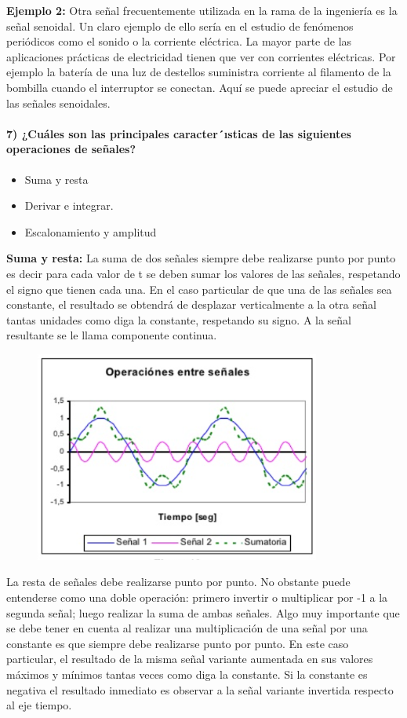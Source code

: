 \documentclass[10pt]{article}
\begin{document}
\textbf{Ejemplo 2:}
Otra señal frecuentemente utilizada en la rama de la ingeniería es la señal senoidal.  Un claro ejemplo de ello sería en el estudio de fenómenos periódicos como el sonido o la corriente eléctrica. La mayor parte de las aplicaciones prácticas de electricidad tienen que ver con corrientes eléctricas. Por ejemplo la batería de una luz de destellos suministra corriente al filamento de la bombilla cuando el interruptor se conectan. Aquí se puede apreciar el estudio de las señales senoidales.\\

\paragraph{7) ¿Cuáles son las principales caracter´ısticas de las siguientes operaciones de señales? }

\begin{itemize}
	\item Suma y resta
	\item Derivar e integrar.
	\item Escalonamiento y amplitud
\end{itemize}

\textbf{Suma y resta:}
La suma de dos señales siempre debe realizarse punto por punto es decir para cada valor de t se deben sumar los valores de las señales, respetando el signo que tienen cada una. En el caso particular de que una de las señales sea constante, el resultado se obtendrá de desplazar verticalmente a la otra señal tantas unidades como diga la constante, respetando su signo. A la señal resultante se le llama componente continua.
\begin{figure}[h]
	\includegraphics[scale=0.6]{S}
	\centering
\end{figure}

La resta de señales debe realizarse punto por punto. No obstante puede entenderse como una doble operación: primero invertir o multiplicar por -1 a la segunda señal; luego realizar la suma de ambas señales. Algo muy importante que se debe tener en cuenta al realizar una multiplicación de una señal por una constante es que siempre debe realizarse punto por punto. En este caso particular, el resultado de la misma señal variante aumentada en sus valores máximos y mínimos tantas veces como diga la constante. Si la constante es negativa el resultado inmediato es observar a la señal variante invertida respecto al eje tiempo.
\end{document}
